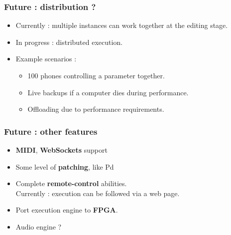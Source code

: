 \documentclass{beamer}
\begin{document}
\begin{frame}
    \frametitle{Future : distribution ?}
    
    \Large
    \begin{itemize}
        \setlength\itemsep{1em}
    	\item Currently : multiple instances can work together at the editing stage.
    	\item In progress : distributed execution.
    	\item Example scenarios :
    	\begin{itemize}
    		\item \large  100 phones controlling a parameter together.
    		\item Live backups if a computer dies during performance.
    		\item Offloading due to performance requirements.
    	\end{itemize}
    	 
    \end{itemize}
\end{frame}

\begin{frame}
    \frametitle{Future : other features}
    \Large
    \begin{itemize}
        \setlength\itemsep{1em}
    \item \textbf{MIDI}, \textbf{WebSockets} support
    \item Some level of \textbf{patching}, like Pd
    \item Complete \textbf{remote-control} abilities.\\ Currently : execution can be followed via a web page.
    \item Port execution engine to \textbf{FPGA}. 
    \item Audio engine ? 
    \end{itemize}
\end{frame}
\end{document}

